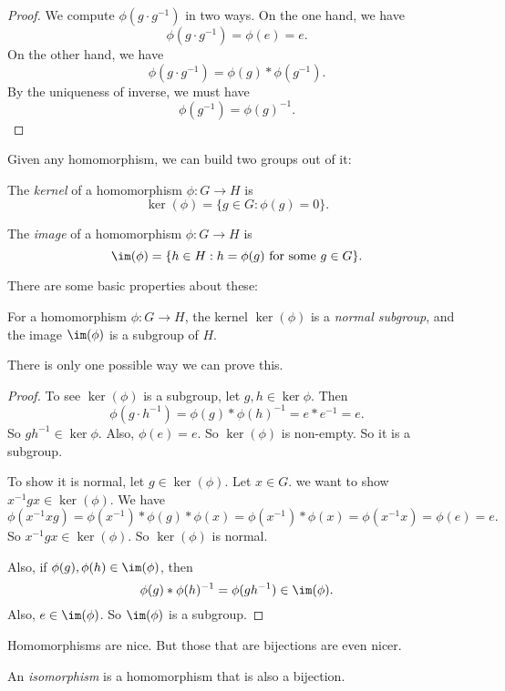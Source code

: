 \documentclass[a4paper]{article}
\begin{document}
\begin{proof}
  We compute $\phi(g\cdot g^{-1})$ in two ways. On the one hand, we have
  \[
    \phi(g\cdot g^{-1}) = \phi(e) = e.
  \]
  On the other hand, we have
  \[
    \phi(g\cdot g^{-1}) = \phi(g) * \phi(g^{-1}).
  \]
  By the uniqueness of inverse, we must have
  \[
    \phi(g^{-1}) = \phi(g)^{-1}.
  \]
\end{proof}

Given any homomorphism, we can build two groups out of it:
\begin{defi}[Kernel]
  The \emph{kernel} of a homomorphism $\phi: G \to H$ is
  \[
    \ker(\phi) = \{g \in G: \phi(g) = 0\}.
  \]
\end{defi}

\begin{defi}[Image]
  The \emph{image} of a homomorphism $\phi: G \to H$ is
  \[
    \im (\phi) = \{h\in H: h = \phi(g) \text{ for some }g \in G\}.
  \]
\end{defi}

There are some basic properties about these:
\begin{lemma}
  For a homomorphism $\phi: G\to H$, the kernel $\ker (\phi)$ is a \emph{normal subgroup}, and the image $\im (\phi)$ is a subgroup of $H$.
\end{lemma}

There is only one possible way we can prove this.
\begin{proof}
  To see $\ker(\phi)$ is a subgroup, let $g, h \in \ker \phi$. Then
  \[
    \phi(g\cdot h^{-1}) = \phi(g) * \phi(h)^{-1} = e * e^{-1} = e.
  \]
  So $gh^{-1} \in \ker \phi$. Also, $\phi(e) = e$. So $\ker(\phi)$ is non-empty. So it is a subgroup.

  To show it is normal, let $g \in \ker(\phi)$. Let $x \in G$. we want to show $x^{-1}gx \in \ker(\phi)$. We have
  \[
    \phi(x^{-1} xg) = \phi(x^{-1}) * \phi(g) * \phi(x) = \phi(x^{-1}) * \phi(x) = \phi(x^{-1}x) = \phi(e) = e.
  \]
  So $x^{-1}gx \in \ker(\phi)$. So $\ker(\phi)$ is normal.

  Also, if $\phi(g), \phi(h) \in \im (\phi)$, then
  \[
    \phi(g) * \phi(h)^{-1} = \phi(gh^{-1}) \in \im (\phi).
  \]
  Also, $e \in \im(\phi)$. So $\im(\phi)$ is a subgroup.
\end{proof}

Homomorphisms are nice. But those that are bijections are even nicer.
\begin{defi}[Isomorphism]
  An \emph{isomorphism} is a homomorphism that is also a bijection.
\end{defi}
\end{document}
